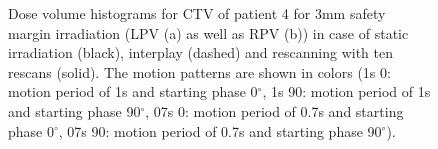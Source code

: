 \begin{figure}[H]
\begin{center}
{ }
\caption{Dose volume histograms for CTV of patient 4 for 3mm safety margin irradiation (LPV (a) as well as RPV (b)) in case of static 
irradiation (black), interplay (dashed) and rescanning with ten rescans (solid). The motion patterns are shown in colors (1s 0: motion period of 1s 
and starting phase 0$^{\circ}$, 1s 90: motion period of 1s and starting phase 90$^{\circ}$, 07s 0: motion period of 0.7s 
and starting phase 0$^{\circ}$, 07s 90: motion period of 0.7s and starting phase 90$^{\circ}$).}
\label{dvhs_pat08}
 \end{center}
\end{figure}


\newpage
\begin{figure}[H]
\end{figure}
